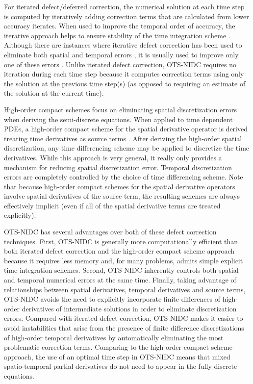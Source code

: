 \documentclass[fleqn,12pt,twoside]{article}
\begin{document}
For iterated defect/deferred correction, the numerical solution at each 
time step is computed by iteratively adding correction terms that are 
calculated from lower accuracy iterates.  When used to improve the 
temporal order of accuracy, the iterative approach helps to ensure 
stability of the time integration scheme \cite{kress_2006}.  Although there 
are instances where iterative defect correction has been used to eliminate 
both spatial and temporal errors \cite{gustafsson_2002}, it is usually used to 
improve only one of these errors \cite{pereyra_1968,kress_2002,kress_2006}.
Unlike iterated defect correction, OTS-NIDC requires no iteration during each
time step because it computes correction terms using only the solution at the
previous time step(s) (as opposed to requiring an estimate of the solution at
the current time).

High-order compact schemes focus on eliminating spatial discretization errors 
when deriving the semi-discrete equations.  When applied to time dependent 
PDEs, a high-order compact scheme for the spatial derivative operator is 
derived treating time derivatives as source 
terms \cite{spotz_2001,ito_2005,heidenreich_2007}.  
After deriving the high-order spatial discretization, any time differencing 
scheme may be applied to discretize the time derivatives.  While this 
approach is very general, it really only provides a mechanism for reducing 
spatial discretization error.  Temporal discretization errors are completely 
controlled by the choice of time differencing scheme.  Note that because 
high-order compact schemes for the spatial derivative operators involve spatial 
derivatives of the source term, the resulting schemes are always effectively 
implicit (even if all of the spatial derivative terms are treated explicitly).  

OTS-NIDC has several advantages over both of these defect correction 
techniques.  First, OTS-NIDC is generally more computationally efficient than 
both iterated defect correction and the high-order compact scheme approach
because it requires less memory and, for many problems, admits simple 
explicit time integration schemes.  Second, OTS-NIDC inherently controls both 
spatial and temporal numerical errors at the same time.  Finally, taking
advantage of relationships between spatial derivatives, temporal derivatives
and source terms, OTS-NIDC avoids the need to explicitly incorporate finite
differences of high-order derivatives of intermediate solutions in order to
eliminate discretization errors. 
Compared with iterated defect correction, OTS-NIDC makes it easier to avoid
instabilities that arise from the presence of finite difference discretizations
of high-order temporal derivatives by automatically eliminating the most
problematic correction terms.  Comparing to the high-order compact scheme
approach, the use of an optimal time step in OTS-NIDC means that mixed 
spatio-temporal partial derivatives do not need to appear in the fully
discrete equations.
\end{document}
